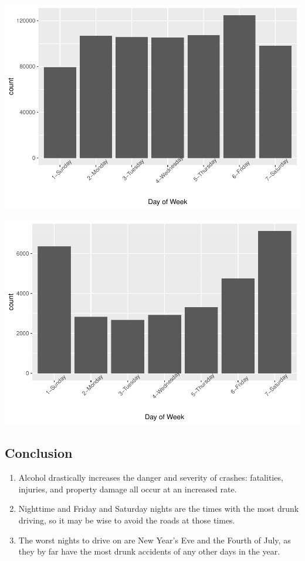\documentclass[conference,final,]{IEEEtran}
\begin{document}
\begin{center}\includegraphics[width=0.9\columnwidth]{CAUSE_files/figure-latex/unnamed-chunk-14-1} \end{center}

\begin{center}\includegraphics[width=0.9\columnwidth]{CAUSE_files/figure-latex/unnamed-chunk-14-2} \end{center}

\hypertarget{conclusion-1}{%
\subsection{Conclusion}\label{conclusion-1}}

\begin{enumerate}
\def\labelenumi{\arabic{enumi}.}
\item
  Alcohol drastically increases the danger and severity of crashes: fatalities, injuries, and property damage all occur at an increased rate.
\item
  Nighttime and Friday and Saturday nights are the times with the most drunk driving, so it may be wise to avoid the roads at those times.
\item
  The worst nights to drive on are New Year's Eve and the Fourth of July, as they by far have the most drunk accidents of any other days in the year.
\end{enumerate}
\end{document}
